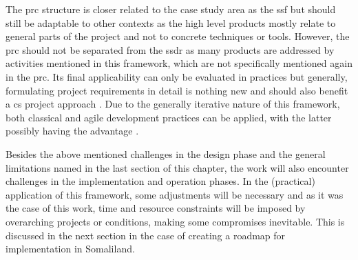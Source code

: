 The \acrshort{prc} structure is closer related to the case study area as the \acrshort{ssf} but should still be adaptable to other contexts as the high level products mostly relate to general parts of the project and not to concrete techniques or tools. However, the \acrshort{prc} should not be separated from the \acrshort{ssdr} as many products are addressed by activities mentioned in this framework, which are not specifically mentioned again in the \acrshort{prc}. Its final applicability can only be evaluated in practices but generally, formulating project requirements in detail is nothing new and should also benefit a \acrshort{cs} project approach \autocite{wiegersSoftwareRequirements2013,youngEffectiveRequirementsPractices2001,youngProjectRequirementsGuide2006}. Due to the generally iterative nature of this framework, both classical and agile development practices can be applied, with the latter possibly having the advantage \autocite{confortoCanAgileProject2014,ManifestoAgileSoftware}.\newline

Besides the above mentioned challenges in the design phase and the general limitations named in the last section of this chapter, the work will also encounter challenges in the implementation and operation phases. In the (practical) application of this framework, some adjustments will be necessary and as it was the case of this work, time and resource constraints will be imposed by overarching projects or conditions, making some compromises inevitable. This is discussed in the next section in the case of creating a roadmap for implementation in Somaliland.



